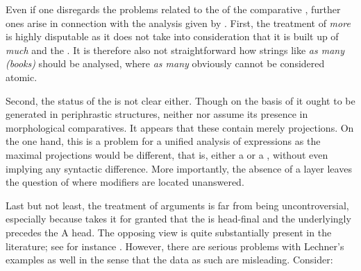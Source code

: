 Even if one disregards the problems related to the  of the comparative , further ones arise in connection with the analysis given by \citet{lechner1999diss, lechner2004}. First, the treatment of \textit{more} is highly disputable as it does not take into consideration that it is built up of \textit{much} and the . It is therefore also not straightforward how strings like \textit{as many (books)} should be analysed, where \textit{as many} obviously cannot be considered atomic.

Second, the status of the  is not clear either. Though on the basis of \citet{lechner1999diss} it ought to be generated in periphrastic structures, neither \citet{lechner1999diss} nor \citet{lechner2004} assume its presence in morphological comparatives. It appears that these contain merely  projections. On the one hand, this is a problem for a unified analysis of  expressions as the maximal projections would be different, that is, either a  or a , without even implying any syntactic difference. More importantly, the absence of a  layer leaves the question of where modifiers are located unanswered.

Last but not least, the treatment of  arguments is far from being uncontroversial, especially because \citet{lechner2004} takes it for granted that the  is head-final and the  underlyingly precedes the A head. The opposing view is quite substantially present in the literature; see for instance \citet{webelhuth1992}. However, there are serious problems with Lechner's examples as well in the sense that the data as such are misleading. Consider:

\ea \label{stolzauf}
\z
\z

